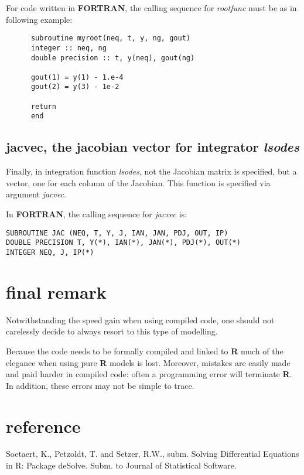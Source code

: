 \documentclass[english]{article}
\newcommand{\R}{\textbf{\textsf{R}}\xspace}
\newcommand{\FOR}{\textbf{\textsf{FORTRAN}}\xspace}
\begin{document}
For code written in \FOR, the calling sequence for \emph{rootfunc}
must be as in following example:
\begin{verbatim}
      subroutine myroot(neq, t, y, ng, gout)
      integer :: neq, ng
      double precision :: t, y(neq), gout(ng)

      gout(1) = y(1) - 1.e-4
      gout(2) = y(3) - 1e-2

      return
      end
\end{verbatim}
\subsection{jacvec, the jacobian vector for integrator \emph{lsodes}}
Finally, in integration function \emph{lsodes}, not the Jacobian matrix
is specified, but a vector, one for each column of the Jacobian.
This function is specified via argument \emph{jacvec}.


In \FOR, the calling sequence for \emph{jacvec} is:
\begin{verbatim}
SUBROUTINE JAC (NEQ, T, Y, J, IAN, JAN, PDJ, OUT, IP)
DOUBLE PRECISION T, Y(*), IAN(*), JAN(*), PDJ(*), OUT(*)
INTEGER NEQ, J, IP(*)
\end{verbatim}


\section{final remark}
Notwithstanding the speed gain when using compiled code, one should
not carelessly decide to always resort to this type of modelling.

Because the code needs to be formally compiled and linked to \R much
of the elegance when using pure \R models is lost. Moreover, mistakes
are easily made and paid harder in compiled code: often a programming
error will terminate \R. In addition, these errors may not be simple
to trace.

\section{reference}
Soetaert, K., Petzoldt, T. and Setzer, R.W., subm. Solving
Differential Equations in R: Package deSolve. Subm. to Journal of
Statistical Software.
\end{document}
